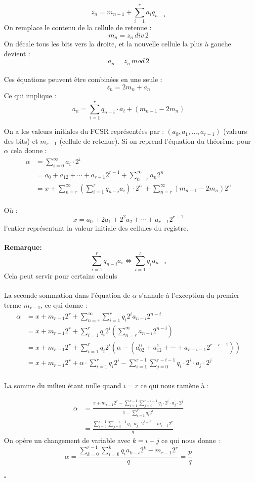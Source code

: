 \documentclass[11pt]{report}
\begin{document}
	\[
		z_n = m_{n-1} + \sum_{i=1}^{r} a_iq_{n-i}
	\]
On remplace le contenu de la cellule de retenue : $$m_n = z_n\, div\, 2$$
On décale tous les bits vers la droite, et la nouvelle cellule la plus à gauche devient : 
$$a_n = z_n \, mod \, 2$$
\\
Ces équations peuvent être combinées en une seule :
$$z_n = 2m_n + a_n$$
Ce qui implique : 
$$a_n = \sum_{i=1}^r q_{n-i} \cdot a_i+(m_{n-1}-2m_n)$$

On a les valeurs initiales du FCSR représentées par : $(a_0,a_1,...,a_{r-1})$ (valeurs des bits) et $m_{r-1}$ (cellule de retenue). 
Si on reprend l'équation du théorème pour $\alpha$ cela donne :
\begin{align*}
\alpha &= \sum_{i=0}^\infty a_i \cdot 2^i\\
	&=	a_0 + a_12 + \cdots + a_{r-1}2^{r-1} + 		\sum_{n=r}^\infty a_n2^n\\
	&= x + \sum_{n=r}^\infty(\sum_{i=1}^r q_{n-i}a_i) \cdot 2^n \, + \sum_{n=r}^\infty (m_{n-1} - 2m_n)2^n\\
\end{align*}



Où :
$$ x = a_0 + 2a_1 + 2^2a_2 + \cdots + a_{r-1}2^{r-1} $$
l'entier représentant la valeur initiale des cellules du registre.
\\
\\
\textbf{Remarque:}
$$
\sum_{i=1}^r q_{n-i}a_i \Leftrightarrow \sum_{i=1}^r q_ia_{n-i}
$$
Cela peut servir pour certains calculs 
\\
\\
La seconde sommation dans l'équation de $\alpha$ s'annule à l'exception du premier terme $m_{r-1}$, ce qui donne : 
\begin{align*}
\alpha &= x + m_{r-1}2^r + \sum_{n=r}^\infty\sum_{i=1}^r q_i2^ia_{n-i}2^{n-i}\\
&= x + m_{r-1}2^r + \sum_{i=1}^r q_i2^i(\sum_{n=r}^\infty a_{n-i}2^{n-i})\\
&= x + m_{r-1}2^r + \sum_{i=1}^r q_i2^i(\alpha - (a_02^0+a_12^1 + \cdots + a_{r-i-1}2^{r-i-1}))\\
&= x + m_{r-1}2^r + \alpha \cdot \sum_{i=1}^r q_i2^i - \sum_{i=1}^{r-1}\sum_{j=0}^{r-i-1} q_i \cdot 2^i \cdot a_j \cdot 2^j\\
\end{align*}

La somme du milieu étant nulle quand $i=r$ ce qui nous ramène à :

\begin{align*}
\alpha &= \frac{x + m_{r-1}2^r - \sum_{i=1}^{r-1}\sum_{j=0}^{r-i-1} q_i \cdot 2^i \cdot a_j \cdot 2^j }{1 - \sum_{i=1}^r q_i2^i}\\
&= \frac{\sum_{i=0}^{r-1}\sum_{j=0}^{r-i-1} q_i \cdot a_j \cdot 2^{i+j} - m_{r-1}2^r}{q}
\end{align*}
On opère un changement de variable avec $k = i+j$
ce qui nous donne :
$$
\alpha = \frac{\sum_{k=0}^{r-1}\sum_{i=0}^k q_ia_{k-i}2^k - m_{r-1}2^r}{q} = \frac{p}{q} 
$$
\begin{flushright}
$\square$
\end{flushright}
\end{document}

